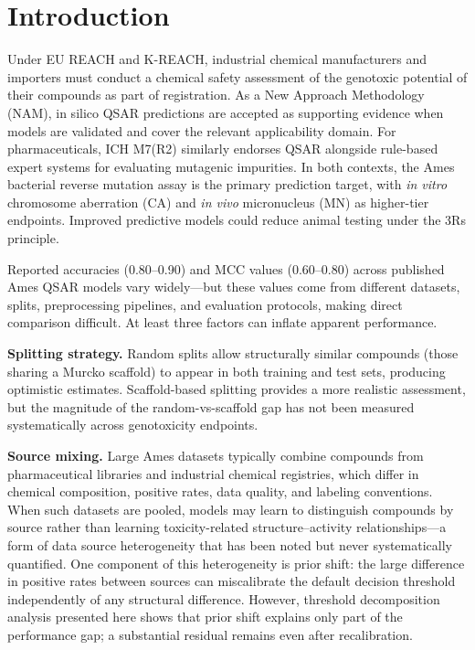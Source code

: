 \section{Introduction}

Under EU REACH\cite{EU_REACH_2006} and K-REACH,\cite{K_REACH_2018} industrial chemical
manufacturers and importers must conduct a chemical safety assessment of the genotoxic
potential of their compounds as part of registration. As a New Approach Methodology (NAM),
in silico QSAR predictions are accepted as supporting evidence when models are validated and
cover the relevant applicability domain.\cite{ECHA_QSAR_2008} For pharmaceuticals, ICH
M7(R2) similarly endorses QSAR alongside rule-based expert systems for evaluating mutagenic
impurities.\cite{ICH_M7_2017} In both contexts, the Ames bacterial reverse mutation
assay\cite{Ames_1973,Mortelmans_2000} is the primary prediction target, with \textit{in vitro}
chromosome aberration (CA) and \textit{in vivo} micronucleus (MN)\cite{OECD_473,OECD_474} as
higher-tier endpoints. Improved predictive models could reduce animal testing under the 3Rs
principle.\cite{Russell_Burch_1959}

Reported accuracies (0.80--0.90) and MCC values (0.60--0.80) across published Ames QSAR
models\cite{Hansen_2009,Xu_2012,Honma_2019,Li_2021} vary widely---but these values come from
different datasets, splits, preprocessing pipelines, and evaluation protocols, making direct
comparison difficult. At least three factors can inflate apparent performance.

\textbf{Splitting strategy.} Random splits allow structurally similar compounds (those
sharing a Murcko scaffold\cite{Bemis_Murcko_1996}) to appear in both training and test
sets, producing optimistic estimates. Scaffold-based
splitting\cite{Sheridan_2013,Wu_MoleculeNet_2018} provides a more realistic assessment,
but the magnitude of the random-vs-scaffold gap has not been measured systematically across
genotoxicity endpoints.

\textbf{Source mixing.} Large Ames datasets typically combine compounds from pharmaceutical
libraries and industrial chemical registries,\cite{Hansen_2009,Honma_2019} which differ in
chemical composition, positive rates, data quality, and labeling conventions. When such
datasets are pooled, models may learn to distinguish compounds by source rather than
learning toxicity-related structure--activity relationships---a form of data source
heterogeneity that has been noted\cite{Tropsha_2010,Hanser_2016} but never systematically
quantified. One component of
this heterogeneity is prior shift: the large difference in positive rates between sources
can miscalibrate the default decision threshold independently of any structural difference.
However, threshold decomposition analysis presented here shows that prior shift explains
only part of the performance gap; a substantial residual remains even after recalibration.

